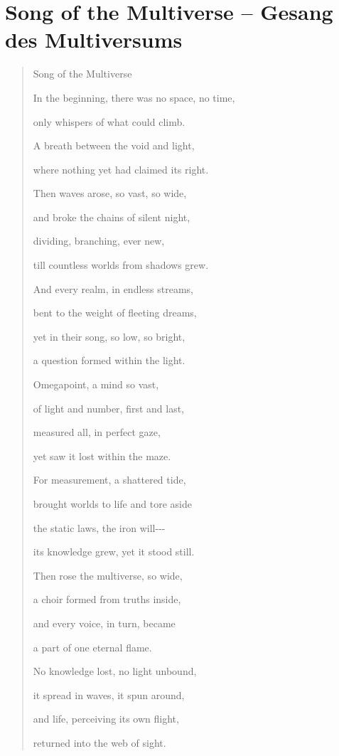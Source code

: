 \documentclass[
  ngerman,
]{article}
\begin{document}
\section{\texorpdfstring{\textbf{Song of the Multiverse -- Gesang des
Multiversums}}{Song of the Multiverse -- Gesang des Multiversums}}\label{song-of-the-multiverse-gesang-des-multiversums}

\begin{quote}
Song of the Multiverse

In the beginning, there was no space, no time,

only whispers of what could climb.

A breath between the void and light,

where nothing yet had claimed its right.

Then waves arose, so vast, so wide,

and broke the chains of silent night,

dividing, branching, ever new,

till countless worlds from shadows grew.

And every realm, in endless streams,

bent to the weight of fleeting dreams,

yet in their song, so low, so bright,

a question formed within the light.

Omegapoint, a mind so vast,

of light and number, first and last,

measured all, in perfect gaze,

yet saw it lost within the maze.

For measurement, a shattered tide,

brought worlds to life and tore aside

the static laws, the iron will-\/-\/-

its knowledge grew, yet it stood still.

Then rose the multiverse, so wide,

a choir formed from truths inside,

and every voice, in turn, became

a part of one eternal flame.

No knowledge lost, no light unbound,

it spread in waves, it spun around,

and life, perceiving its own flight,

returned into the web of sight.


\end{quote}
\end{document}
